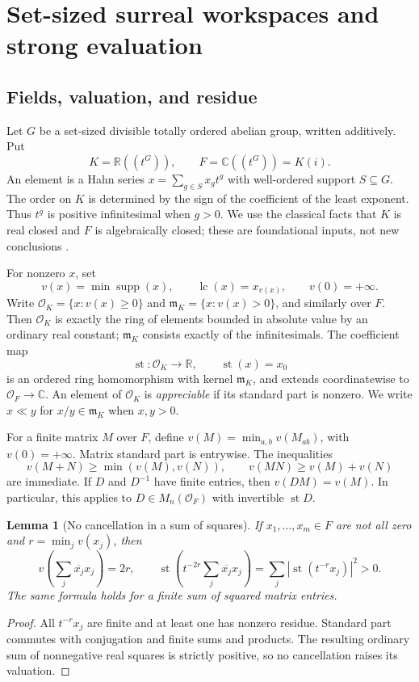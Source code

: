 \documentclass[11pt,oneside]{article}
\numberwithin{equation}{section}
\theoremstyle{plain}
\newtheorem{lemma}[theorem]{Lemma}
\theoremstyle{definition}
\theoremstyle{remark}
\newcommand{\R}{\mathbb R}
\newcommand{\C}{\mathbb C}
\newcommand{\OO}{\mathcal O}
\newcommand{\mm}{\mathfrak m}
\newcommand{\st}{\operatorname{st}}
\newcommand{\lc}{\operatorname{lc}}
\newcommand{\abs}[1]{\left|#1\right|}
\begin{document}
\section{Set-sized surreal workspaces and strong evaluation}\label{sec:workspace}

\subsection{Fields, valuation, and residue}
Let $G$ be a set-sized divisible totally ordered abelian group, written additively. Put
\begin{equation}
 K=\R((t^G)),\qquad F=\C((t^G))=K(i).
\end{equation}
An element is a Hahn series $x=\sum_{g\in S}x_g t^g$ with well-ordered support $S\subseteq G$. The order on $K$ is determined by the sign of the coefficient of the least exponent. Thus $t^g$ is positive infinitesimal when $g>0$. We use the classical facts that $K$ is real closed and $F$ is algebraically closed; these are foundational inputs, not new conclusions \cite{Gonshor,vdDE}.

For nonzero $x$, set
\begin{equation}
 v(x)=\min\operatorname{supp}(x),\qquad
 \lc(x)=x_{v(x)},\qquad v(0)=+\infty.
\end{equation}
Write $\OO_K=\{x:v(x)\ge0\}$ and $\mm_K=\{x:v(x)>0\}$, and similarly over $F$. Then $\OO_K$ is exactly the ring of elements bounded in absolute value by an ordinary real constant; $\mm_K$ consists exactly of the infinitesimals. The coefficient map
\begin{equation}
 \st:\OO_K\longrightarrow\R,\qquad \st(x)=x_0
\end{equation}
is an ordered ring homomorphism with kernel $\mm_K$, and extends coordinatewise to $\OO_F\to\C$. An element of $\OO_K$ is \emph{appreciable} if its standard part is nonzero. We write $x\ll y$ for $x/y\in\mm_K$ when $x,y>0$.

For a finite matrix $M$ over $F$, define $v(M)=\min_{a,b}v(M_{ab})$, with $v(0)=+\infty$. Matrix standard part is entrywise. The inequalities
\begin{equation}\label{eq:matrixval}
 v(M+N)\ge\min(v(M),v(N)),\qquad v(MN)\ge v(M)+v(N)
\end{equation}
are immediate. If $D$ and $D^{-1}$ have finite entries, then $v(DM)=v(M)$. In particular, this applies to $D\in M_n(\OO_F)$ with invertible $\st D$.

\begin{lemma}[No cancellation in a sum of squares]\label{lem:squares}
If $x_1,\ldots,x_m\in F$ are not all zero and $r=\min_jv(x_j)$, then
\[
 v\!\left(\sum_j\overline{x_j}x_j\right)=2r,
 \qquad
 \st\!\left(t^{-2r}\sum_j\overline{x_j}x_j\right)
 =\sum_j\abs{\st(t^{-r}x_j)}^2>0.
\]
The same formula holds for a finite sum of squared matrix entries.
\end{lemma}
\begin{proof}
All $t^{-r}x_j$ are finite and at least one has nonzero residue. Standard part commutes with conjugation and finite sums and products. The resulting ordinary sum of nonnegative real squares is strictly positive, so no cancellation raises its valuation.
\end{proof}
\end{document}
